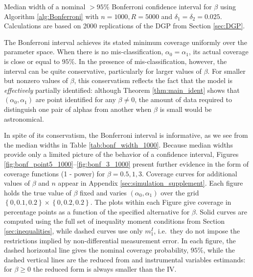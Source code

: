 \begin{table}
  \small
  \centering
  
  \caption{Median width of a nominal $>95\%$ Bonferroni confidence interval for $\beta$ using Algorithm \ref{alg:Bonferroni} with $n = 1000, R = 5000$ and $\delta_1 = \delta_2 = 0.025$. Calculations are based on 2000 replications of the DGP from Section \ref{sec:DGP}.}
  \label{tab:bonf_width_1000}
\end{table}

The Bonferroni interval achieves its stated minimum coverage uniformly over the parameter space.
When there is no mis-classification, $\alpha_0 = \alpha_1$, its actual coverage is close or equal to $95\%$.
In the presence of mis-classification, however, the interval can be quite conservative, particularly for larger values of $\beta$.
For smaller but nonzero values of $\beta$, this conservatism reflects the fact that the model is \emph{effectively} partially identified: although Theorem \ref{thm:main_ident} shows that $(\alpha_0, \alpha_1)$ are point identified for any $\beta\neq 0$, the amount of data required to distinguish one pair of alphas from another when $\beta$ is small would be astronomical.

In spite of its conservatism, the Bonferroni interval is informative, as we see from the median widths in Table \ref{tab:bonf_width_1000}. 
Because median widths provide only a limited picture of the behavior of a confidence interval, Figures \ref{fig:bonf_point5_1000}--\ref{fig:bonf_3_1000} present further evidence in the form of coverage functions (1 - power) for $\beta = 0.5, 1, 3$.
Coverage curves for additional values of $\beta$ and $n$ appear in Appendix \ref{sec:simulation_supplement}. 
Each figure holds the true value of $\beta$ fixed and varies $(\alpha_0, \alpha_1)$ over the grid $\left\{ 0, 0.1, 0.2 \right\}\times \left\{ 0, 0.2, 0.2 \right\}$. 
The plots within each Figure give coverage in percentage points as a function of the specified alternative for $\beta$.
Solid curves are computed using the full set of inequality moment conditions from  Section \ref{sec:inequalities}, while dashed curves use only $m_{1}^I$, i.e.\ they do not impose the restrictions implied by non-differential measurement error.
In each figure, the dashed horizontal line gives the nominal coverage probability, $95\%$, while the dashed vertical lines are the reduced from  and instrumental variables estimands: for $\beta \geq 0$ the reduced form is always smaller than the IV.


